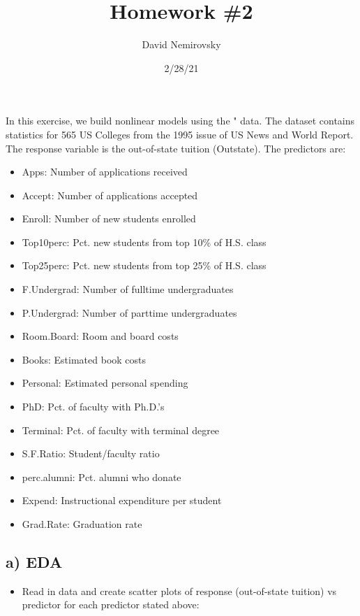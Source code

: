\documentclass[
]{article}
\title{Homework \#2}
\author{David Nemirovsky}
\date{2/28/21}
\providecommand{\tightlist}{%
  \setlength{\itemsep}{0pt}\setlength{\parskip}{0pt}}
\begin{document}
\maketitle

In this exercise, we build nonlinear models using the \College" data.
The dataset contains statistics for 565 US Colleges from the 1995 issue
of US News and World Report. The response variable is the out-of-state
tuition (Outstate). The predictors are:

\begin{itemize}
\item
  Apps: Number of applications received
\item
  Accept: Number of applications accepted
\item
  Enroll: Number of new students enrolled
\item
  Top10perc: Pct. new students from top 10\% of H.S. class
\item
  Top25perc: Pct. new students from top 25\% of H.S. class
\item
  F.Undergrad: Number of fulltime undergraduates
\item
  P.Undergrad: Number of parttime undergraduates
\item
  Room.Board: Room and board costs
\item
  Books: Estimated book costs
\item
  Personal: Estimated personal spending
\item
  PhD: Pct. of faculty with Ph.D.'s
\item
  Terminal: Pct. of faculty with terminal degree
\item
  S.F.Ratio: Student/faculty ratio
\item
  perc.alumni: Pct. alumni who donate
\item
  Expend: Instructional expenditure per student
\item
  Grad.Rate: Graduation rate
\end{itemize}

\hypertarget{a-eda}{%
\subsection{\texorpdfstring{\textbf{a) EDA}}{a) EDA}}\label{a-eda}}

\begin{itemize}
\tightlist
\item
  Read in data and create scatter plots of response (out-of-state
  tuition) vs predictor for each predictor stated above:
\end{itemize}
\end{document}
